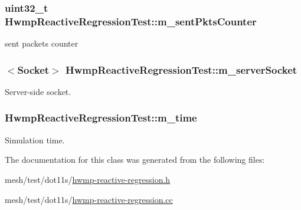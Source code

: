 \subsubsection[{\texorpdfstring{m\+\_\+sent\+Pkts\+Counter}{m_sentPktsCounter}}]{\setlength{\rightskip}{0pt plus 5cm}uint32\+\_\+t Hwmp\+Reactive\+Regression\+Test\+::m\+\_\+sent\+Pkts\+Counter\hspace{0.3cm}{\ttfamily [private]}}\hypertarget{classHwmpReactiveRegressionTest_aee0fdd7ae170bf11602e468997bdd589}{}\label{classHwmpReactiveRegressionTest_aee0fdd7ae170bf11602e468997bdd589}


sent packets counter 

\subsubsection[{\texorpdfstring{m\+\_\+server\+Socket}{m_serverSocket}}]{$<${\bf Socket}$>$ Hwmp\+Reactive\+Regression\+Test\+::m\+\_\+server\+Socket\hspace{0.3cm}{\ttfamily [private]}}\hypertarget{classHwmpReactiveRegressionTest_afe23c3cdf2f9507dc98d05d4879bdce8}{}\label{classHwmpReactiveRegressionTest_afe23c3cdf2f9507dc98d05d4879bdce8}


Server-\/side socket. 

\subsubsection[{\texorpdfstring{m\+\_\+time}{m_time}}]{ Hwmp\+Reactive\+Regression\+Test\+::m\+\_\+time\hspace{0.3cm}{\ttfamily [private]}}\hypertarget{classHwmpReactiveRegressionTest_af41a55e333aa6f51562e7042c82e83e2}{}\label{classHwmpReactiveRegressionTest_af41a55e333aa6f51562e7042c82e83e2}


Simulation time. 



The documentation for this class was generated from the following files\+:\begin{DoxyCompactItemize}
\item 
mesh/test/dot11s/\hyperlink{hwmp-reactive-regression_8h}{hwmp-\/reactive-\/regression.\+h}\item 
mesh/test/dot11s/\hyperlink{hwmp-reactive-regression_8cc}{hwmp-\/reactive-\/regression.\+cc}\end{DoxyCompactItemize}
